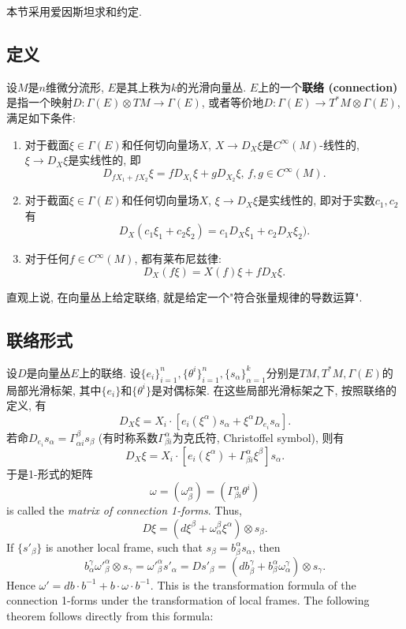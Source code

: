 
本节采用爱因斯坦求和约定.

\subsection{定义}
设$M$是$n$维微分流形, $E$是其上秩为$k$的光滑向量丛. $E$上的一个\textbf{联络 (connection) }是指一个映射$D:\Gamma(E)\otimes TM\to\Gamma(E)$, 或者等价地$D:\Gamma(E)\to T^*M\otimes\Gamma(E)$, 满足如下条件:

\begin{enumerate}
\item 对于截面$\xi\in\Gamma(E)$和任何切向量场$X$, $X\to D_X\xi$是$C^\infty(M)$-线性的, $\xi\to D_X\xi$是实线性的, 即
$$
D_{fX_1+fX_2}\xi=fD_{X_1}\xi+gD_{X_2}\xi,\,f,g\in C^\infty(M).
$$
\item 对于截面$\xi\in\Gamma(E)$和任何切向量场$X$, $\xi\to D_X\xi$是实线性的, 即对于实数$c_1,c_2$有
$$
D_X(c_1\xi_1+c_2\xi_2)=c_1D_X\xi_1+c_2D_X\xi_2).
$$
\item 对于任何$f\in C^\infty(M)$, 都有莱布尼兹律:
$$
D_X(f\xi)=X(f)\xi+fD_X\xi.
$$
\end{enumerate}

直观上说, 在向量丛上给定联络, 就是给定一个"符合张量规律的导数运算". 

\subsection{联络形式}
设$D$是向量丛$E$上的联络. 设$\{e_i\}_{i=1}^n,\{\theta^i\}_{i=1}^n,\{s_\alpha\}_{\alpha=1}^k$分别是$TM,T^*M,\Gamma(E)$的局部光滑标架, 其中$\{e_i\}$和$\{\theta^i\}$是对偶标架. 在这些局部光滑标架之下, 按照联络的定义, 有
$$
D_X\xi=X_i\cdot\left[e_i(\xi^\alpha)s_\alpha+\xi^\alpha D_{e_i}s_\alpha\right].
$$
若命$D_{e_i}s_\alpha=\Gamma_{\alpha i}^\beta s_\beta$ (有时称系数$\Gamma^\alpha_{\beta i}$为克氏符, Christoffel symbol), 则有
$$
D_X\xi=X_i\cdot\left[e_i(\xi^\alpha)+\Gamma_{\beta i}^\alpha\xi^\beta \right]s_\alpha.
$$
于是1-形式的矩阵
$$
\omega=(\omega_\beta^\alpha)=(\Gamma_{\beta i}^\alpha\theta^i)
$$
is called the \emph{matrix of connection 1-forms}. Thus,
$$D\xi=(d\xi^\beta+\omega_\alpha^\beta\xi^\alpha)\otimes s_\beta.$$
If $\{s'_\beta\}$ is another local frame, such that $s_\beta=b_\beta^\alpha s_\alpha$, then
$$b_\alpha^\gamma{\omega'}_{\beta}^{\alpha}\otimes s_\gamma={\omega'}_{\beta}^{\alpha}s'_\alpha=Ds'_\beta=(db_\beta^\gamma+b_\beta^\alpha\omega_\alpha^\gamma)\otimes s_\gamma.$$
Hence $\omega'=db\cdot b^{-1}+b\cdot\omega\cdot b^{-1}$. This is the transformation formula of the connection 1-forms under the transformation of local frames. The following theorem follows directly from this formula:

